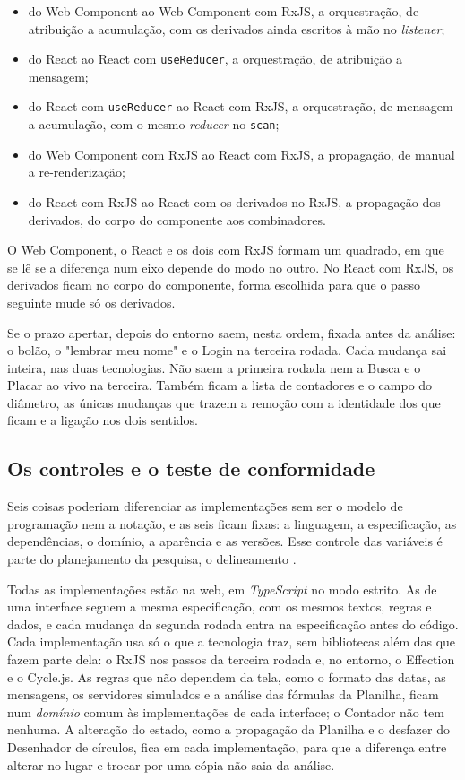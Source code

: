 \begin{itemize}
\item do Web Component ao Web Component com RxJS, a orquestração, de
atribuição a acumulação, com os derivados ainda escritos à mão no
\emph{listener};
\item do React ao React com \texttt{useReducer}, a orquestração, de atribuição a
mensagem;
\item do React com \texttt{useReducer} ao React com RxJS, a orquestração, de
mensagem a acumulação, com o mesmo \emph{reducer} no \texttt{scan};
\item do Web Component com RxJS ao React com RxJS, a propagação, de manual
a re-renderização;
\item do React com RxJS ao React com os derivados no RxJS, a propagação dos
derivados, do corpo do componente aos combinadores.
\end{itemize}

O Web Component, o React e os dois com RxJS formam um quadrado, em que
se lê se a diferença num eixo depende do modo no outro.
No React com RxJS, os derivados ficam no corpo do componente, forma
escolhida para que o passo seguinte mude só os derivados.

Se o prazo apertar, depois do entorno saem, nesta ordem, fixada antes
da análise: o bolão, o "lembrar meu nome" e o Login na terceira rodada.
Cada mudança sai inteira, nas duas tecnologias.
Não saem a primeira rodada nem a Busca e o Placar ao vivo na terceira.
Também ficam a lista de contadores e o campo do diâmetro, as únicas
mudanças que trazem a remoção com a identidade dos que ficam e a
ligação nos dois sentidos.
\subsection{Os controles e o teste de conformidade}
\label{sec:os-controles-e-o-teste-de-conformidade}

Seis coisas poderiam diferenciar as implementações sem ser o modelo de
programação nem a notação, e as seis ficam fixas: a linguagem, a
especificação, as dependências, o domínio, a aparência e as versões.
Esse controle das variáveis é parte do planejamento da pesquisa, o
delineamento \cite[p. 54]{prodanov2013}.

Todas as implementações estão na web, em \emph{TypeScript} no modo estrito.
As de uma interface seguem a mesma especificação, com os mesmos textos,
regras e dados, e cada mudança da segunda rodada entra na especificação
antes do código.
Cada implementação usa só o que a tecnologia traz, sem bibliotecas além
das que fazem parte dela: o RxJS nos passos da terceira rodada e, no
entorno, o Effection e o Cycle.js.
As regras que não dependem da tela, como o formato das datas, as
mensagens, os servidores simulados e a análise das fórmulas da
Planilha, ficam num \emph{domínio} comum às implementações de cada
interface; o Contador não tem nenhuma.
A alteração do estado, como a propagação da Planilha e o desfazer do
Desenhador de círculos, fica em cada implementação, para que a
diferença entre alterar no lugar e trocar por uma cópia não saia da
análise.

